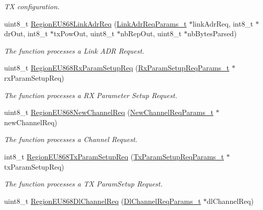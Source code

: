 \begin{DoxyCompactItemize}
\begin{DoxyCompactList}\small\item\em TX configuration. \end{DoxyCompactList}\item 
uint8\+\_\+t \mbox{\hyperlink{group___r_e_g_i_o_n_e_u868_gace7b25487170fb5d862413fc221f95db}{Region\+E\+U868\+Link\+Adr\+Req}} (\mbox{\hyperlink{group___r_e_g_i_o_n_gad4af503e8d4de1846129e26a799a1e8e}{Link\+Adr\+Req\+Params\+\_\+t}} $\ast$link\+Adr\+Req, int8\+\_\+t $\ast$dr\+Out, int8\+\_\+t $\ast$tx\+Pow\+Out, uint8\+\_\+t $\ast$nb\+Rep\+Out, uint8\+\_\+t $\ast$nb\+Bytes\+Parsed)
\begin{DoxyCompactList}\small\item\em The function processes a Link A\+DR Request. \end{DoxyCompactList}\item 
uint8\+\_\+t \mbox{\hyperlink{group___r_e_g_i_o_n_e_u868_gaa175de2c9f3882ef0b89120db3d8882d}{Region\+E\+U868\+Rx\+Param\+Setup\+Req}} (\mbox{\hyperlink{group___r_e_g_i_o_n_ga7165f282c670c728c36d534df2285157}{Rx\+Param\+Setup\+Req\+Params\+\_\+t}} $\ast$rx\+Param\+Setup\+Req)
\begin{DoxyCompactList}\small\item\em The function processes a RX Parameter Setup Request. \end{DoxyCompactList}\item 
uint8\+\_\+t \mbox{\hyperlink{group___r_e_g_i_o_n_e_u868_ga4325b111d5f14ddc4b33f5e827a8986e}{Region\+E\+U868\+New\+Channel\+Req}} (\mbox{\hyperlink{group___r_e_g_i_o_n_gae2abcdb6dbb843c9faf5fd3009eca9d6}{New\+Channel\+Req\+Params\+\_\+t}} $\ast$new\+Channel\+Req)
\begin{DoxyCompactList}\small\item\em The function processes a Channel Request. \end{DoxyCompactList}\item 
int8\+\_\+t \mbox{\hyperlink{group___r_e_g_i_o_n_e_u868_ga7f1768fb828bb81f3f6faec0dc734d29}{Region\+E\+U868\+Tx\+Param\+Setup\+Req}} (\mbox{\hyperlink{group___r_e_g_i_o_n_ga26836ef2996e70410e42ef471073f855}{Tx\+Param\+Setup\+Req\+Params\+\_\+t}} $\ast$tx\+Param\+Setup\+Req)
\begin{DoxyCompactList}\small\item\em The function processes a TX Param\+Setup Request. \end{DoxyCompactList}\item 
uint8\+\_\+t \mbox{\hyperlink{group___r_e_g_i_o_n_e_u868_ga61ddb6ba84f203ba1c7ab3b19e2322aa}{Region\+E\+U868\+Dl\+Channel\+Req}} (\mbox{\hyperlink{group___r_e_g_i_o_n_gae0d608ff1f8ea0a430e4f9a4c38ec7f3}{Dl\+Channel\+Req\+Params\+\_\+t}} $\ast$dl\+Channel\+Req)

\end{DoxyCompactItemize}

